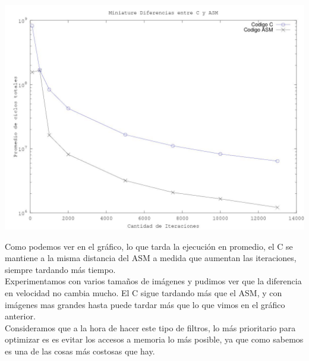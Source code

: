 \begin{center}
\includegraphics[width=16cm]{imagenes/medicionMiniature.jpg}  
\end{center}

Como podemos ver en el gr\'afico, lo que tarda la ejecuci\'on en promedio, el C se mantiene a la misma distancia del ASM a medida que aumentan las iteraciones, siempre tardando m\'as tiempo.\\

Experimentamos con varios tamaños de im\'agenes y pudimos ver que la diferencia en velocidad no cambia mucho. El C sigue tardando m\'as que el ASM, y con im\'agenes mas grandes hasta puede tardar m\'as que lo que vimos en el gr\'afico anterior.\\
Consideramos que a la hora de hacer este tipo de filtros, lo m\'as prioritario para optimizar es es evitar los accesos a memoria lo m\'as posible, ya que como sabemos es una de las cosas m\'as costosas que hay.\\



